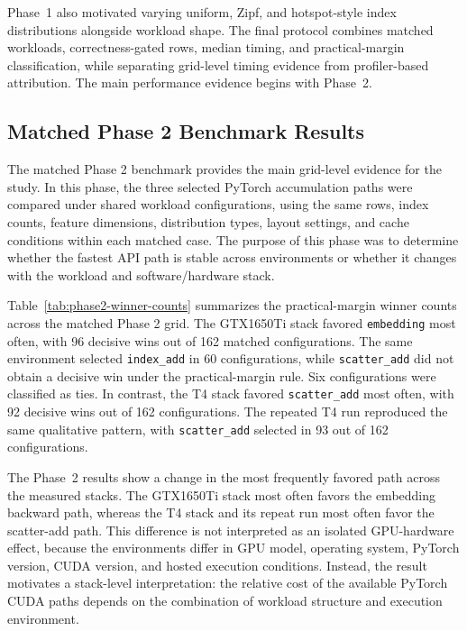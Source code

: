 Phase~1 also motivated varying uniform, Zipf, and hotspot-style index distributions alongside workload shape. The final protocol combines matched workloads, correctness-gated rows, median timing, and practical-margin classification, while separating grid-level timing evidence from profiler-based attribution. The main performance evidence begins with Phase~2.

\subsection{Matched Phase 2 Benchmark Results}

The matched Phase 2 benchmark provides the main grid-level evidence for the study. In this phase, the three selected PyTorch accumulation paths were compared under shared workload configurations, using the same rows, index counts, feature dimensions, distribution types, layout settings, and cache conditions within each matched case. The purpose of this phase was to determine whether the fastest API path is stable across environments or whether it changes with the workload and software/hardware stack.

Table~\ref{tab:phase2-winner-counts} summarizes the practical-margin winner counts across the matched Phase 2 grid. The GTX1650Ti stack favored \texttt{embedding} most often, with 96 decisive wins out of 162 matched configurations. The same environment selected \texttt{index\_\allowbreak add} in 60 configurations, while \texttt{scatter\_\allowbreak add} did not obtain a decisive win under the practical-margin rule. Six configurations were classified as ties. In contrast, the T4 stack favored \texttt{scatter\_\allowbreak add} most often, with 92 decisive wins out of 162 configurations. The repeated T4 run reproduced the same qualitative pattern, with \texttt{scatter\_\allowbreak add} selected in 93 out of 162 configurations.



The Phase~2 results show a change in the most frequently favored path across the measured stacks. The GTX1650Ti stack most often favors the embedding backward path, whereas the T4 stack and its repeat run most often favor the scatter-add path. This difference is not interpreted as an isolated GPU-hardware effect, because the environments differ in GPU model, operating system, PyTorch version, CUDA version, and hosted execution conditions. Instead, the result motivates a stack-level interpretation: the relative cost of the available PyTorch CUDA paths depends on the combination of workload structure and execution environment.

